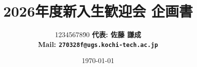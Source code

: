 \title{2026年度新入生歓迎会 企画書}
\date{\today}
\author{
	\begin{tabbing}
		12345678\=90\kill
		\large\bf{代表}\>:
		\large\bf{佐藤 謙成}\\
		Mail\>:
		\texttt{270328f@ugs.kochi-tech.ac.jp}\\
	\end{tabbing}
}